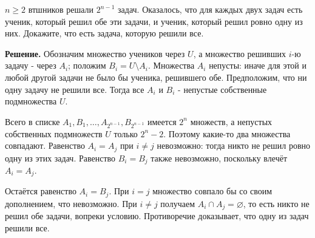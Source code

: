 \begin{problems}
\item  $n \geq 2$ втшников решали $2^{n-1}$ задач. Оказалось, что для каждых двух задач есть ученик, который решил обе эти задачи, и ученик, который решил ровно одну из них. Докажите, что есть задача, которую решили все.
\par\smallskip\noindent\textbf{Решение.} Обозначим множество учеников через $U$, а множество решивших $i$-ю задачу - через $A_i$; положим $B_i=U\setminus A_i$. Множества $A_i$ непусты: иначе для этой и любой другой задачи не было бы ученика, решившего обе. Предположим, что ни одну задачу не решили все. Тогда все $A_i$ и $B_i$ - непустые собственные подмножества $U$.
\par Всего в списке $A_1,B_1,\ldots,A_{2^{n-1}},B_{2^{n-1}}$ имеется $2^n$ множеств, а непустых собственных подмножеств $U$ только $2^n-2$. Поэтому какие-то два множества совпадают. Равенство $A_i=A_j$ при $i\ne j$ невозможно: тогда никто не решил ровно одну из этих задач. Равенство $B_i=B_j$ также невозможно, поскольку влечёт $A_i=A_j$.
\par Остаётся равенство $A_i=B_j$. При $i=j$ множество совпало бы со своим дополнением, что невозможно. При $i\ne j$ получаем $A_i\cap A_j=\varnothing$, то есть никто не решил обе задачи, вопреки условию. Противоречие доказывает, что одну из задач решили все.\par

\end{problems}


